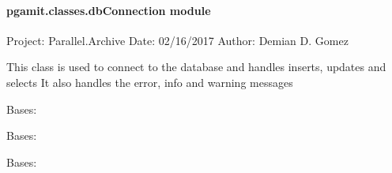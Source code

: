 \documentclass[letterpaper,10pt,english]{sphinxmanual}
\begin{document}
\paragraph{pgamit.classes.dbConnection module}
\label{\detokenize{pgamit.classes:module-pgamit.classes.dbConnection}}\label{\detokenize{pgamit.classes:pgamit-classes-dbconnection-module}}
\sphinxAtStartPar
Project: Parallel.Archive
Date: 02/16/2017
Author: Demian D. Gomez

\sphinxAtStartPar
This class is used to connect to the database and handles inserts, updates and selects
It also handles the error, info and warning messages

\begin{fulllineitems}
\label{\detokenize{pgamit.classes:pgamit.classes.dbConnection.dbErrConnect}}
\pysigstartsignatures
\pysigline
{}
\pysigstopsignatures
\sphinxAtStartPar
Bases: 

\end{fulllineitems}


\begin{fulllineitems}
\label{\detokenize{pgamit.classes:pgamit.classes.dbConnection.dbErrDelete}}
\pysigstartsignatures
\pysigline
{}
\pysigstopsignatures
\sphinxAtStartPar
Bases: 

\end{fulllineitems}


\begin{fulllineitems}
\label{\detokenize{pgamit.classes:pgamit.classes.dbConnection.dbErrInsert}}
\pysigstartsignatures
\pysigline
{}
\pysigstopsignatures
\sphinxAtStartPar
Bases: 

\end{fulllineitems}
\end{document}
